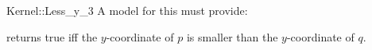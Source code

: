 \begin{ccRefFunctionObjectConcept}{Kernel::Less_y_3}
A model for this must provide:


{returns true iff the $y$-coordinate of $p$ is smaller than the
$y$-coordinate of $q$.}

\end{ccRefFunctionObjectConcept}
